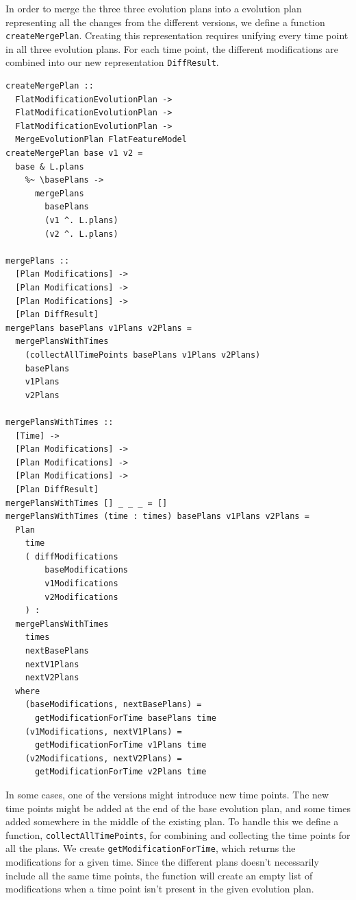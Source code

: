 \documentclass[a4paper,english]{ifimaster}
\begin{document}
In order to merge the three three evolution plans into a evolution plan representing all the changes from the different versions, we define a function \texttt{createMergePlan}. Creating this representation requires unifying every time point in all three evolution plans. For each time point, the different modifications are combined into our new representation \texttt{DiffResult}. 

\begin{verbatim}
createMergePlan ::
  FlatModificationEvolutionPlan ->
  FlatModificationEvolutionPlan ->
  FlatModificationEvolutionPlan ->
  MergeEvolutionPlan FlatFeatureModel
createMergePlan base v1 v2 =
  base & L.plans
    %~ \basePlans ->
      mergePlans
        basePlans
        (v1 ^. L.plans)
        (v2 ^. L.plans)

mergePlans ::
  [Plan Modifications] ->
  [Plan Modifications] ->
  [Plan Modifications] ->
  [Plan DiffResult]
mergePlans basePlans v1Plans v2Plans =
  mergePlansWithTimes
    (collectAllTimePoints basePlans v1Plans v2Plans)
    basePlans
    v1Plans
    v2Plans

mergePlansWithTimes ::
  [Time] ->
  [Plan Modifications] ->
  [Plan Modifications] ->
  [Plan Modifications] ->
  [Plan DiffResult]
mergePlansWithTimes [] _ _ _ = []
mergePlansWithTimes (time : times) basePlans v1Plans v2Plans =
  Plan
    time
    ( diffModifications
        baseModifications
        v1Modifications
        v2Modifications
    ) :
  mergePlansWithTimes
    times
    nextBasePlans
    nextV1Plans
    nextV2Plans
  where
    (baseModifications, nextBasePlans) =
      getModificationForTime basePlans time
    (v1Modifications, nextV1Plans) =
      getModificationForTime v1Plans time
    (v2Modifications, nextV2Plans) =
      getModificationForTime v2Plans time
\end{verbatim}

In some cases, one of the versions might introduce new time points. The new time points might be added at the end of the base evolution plan, and some times added somewhere in the middle of the existing plan. To handle this we define a function, \texttt{collectAllTimePoints}, for combining and collecting the time points for all the plans. We create \texttt{getModificationForTime}, which returns the modifications for a given time. Since the different plans doesn't necessarily include all the same time points, the function will create an empty list of modifications when a time point isn't present in the given evolution plan.
\end{document}
